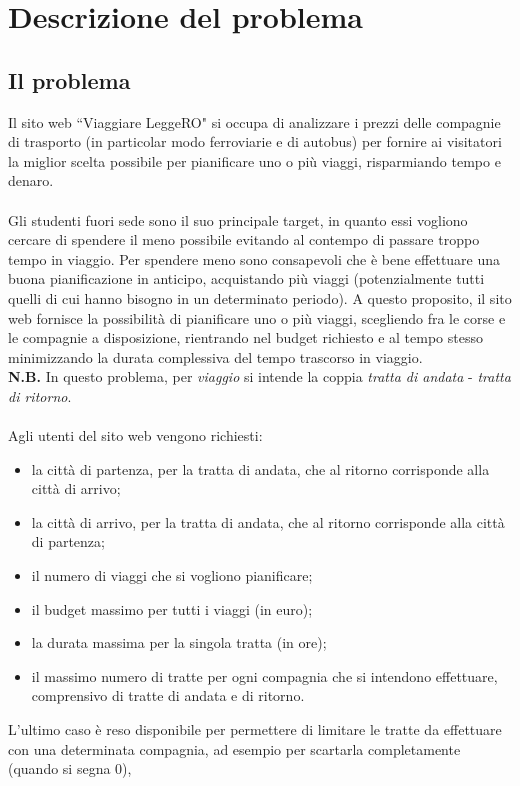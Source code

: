\documentclass[main.tex]{subfiles}
\begin{document}
\section{Descrizione del problema}
\subsection{Il problema}
Il sito web ``Viaggiare LeggeRO" si occupa di analizzare i prezzi delle compagnie di trasporto (in particolar modo ferroviarie e di autobus) per fornire
ai visitatori la miglior scelta possibile per pianificare uno o più viaggi, risparmiando tempo e denaro.\\ \\
Gli studenti fuori sede sono il suo principale target, in quanto essi vogliono cercare di spendere il meno possibile evitando al contempo di passare troppo tempo in viaggio.
Per spendere meno sono consapevoli che è bene effettuare una buona pianificazione in anticipo, acquistando più viaggi (potenzialmente tutti quelli di cui hanno bisogno in un determinato periodo).
A questo proposito, il sito web fornisce la possibilità di pianificare uno o più viaggi, scegliendo fra le corse e le compagnie a disposizione, 
rientrando nel budget richiesto e al tempo stesso minimizzando la durata complessiva del tempo trascorso in viaggio.\\
\textbf{N.B.} In questo problema, per \textit{viaggio} si intende la coppia \textit{tratta di andata} - \textit{tratta di ritorno}.\\ \\
Agli utenti del sito web vengono richiesti:
\begin{itemize}
    \item la città di partenza, per la tratta di andata, che al ritorno corrisponde alla città di arrivo;
    \item la città di arrivo, per la tratta di andata, che al ritorno corrisponde alla città di partenza;
    \item il numero di viaggi che si vogliono pianificare;
    \item il budget massimo per tutti i viaggi (in euro);
    \item la durata massima per la singola tratta (in ore);
    \item il massimo numero di tratte per ogni compagnia che si intendono effettuare, comprensivo di tratte di andata e di ritorno.
\end{itemize}
L'ultimo caso è reso disponibile per permettere di limitare le tratte da effettuare con una determinata compagnia, ad esempio per scartarla completamente (quando si segna 0), 
\end{document}
